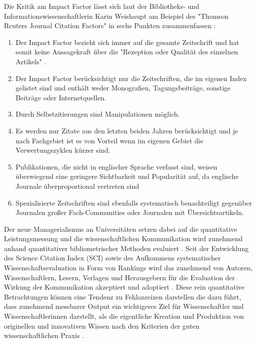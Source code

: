 Die Kritik am Impact Factor lässt sich laut der Bibliotheks- und Informationswissenschaftlerin Karin Weishaupt am Beispiel des "Thomson Reuters Journal Citation Factors" in sechs Punkten zusammenfassen \cite{Weishaupt_2009}:
\begin{enumerate}
\item Der Impact Factor bezieht sich immer auf die gesamte Zeitschrift und hat somit keine Aussagekraft über die "Rezeption oder Qualität des einzelnen Artikels" \cite{Weishaupt_2009}.
\item Der Impact Factor berücksichtigt nur die Zeitschriften, die im eigenen Index gelistet sind und enthält weder Monografien, Tagungsbeiträge, sonstige Beiträge oder Internetquellen.
\item Durch Selbstzitierungen sind Manipulationen möglich.
\item Es werden nur Zitate aus den letzten beiden Jahren berücksichtigt und je nach Fachgebiet ist es von Vorteil wenn im eigenen Gebiet die Verwertungszyklen kürzer sind.
\item Publikationen, die nicht in englischer Sprache verfasst sind, weisen überwiegend eine geringere Sichtbarkeit und Popularität auf, da englische Journale überproportional vertreten sind
\item Spezialisierte Zeitschriften sind ebenfalls systematisch benachteiligt gegenüber Journalen großer Fach-Communities oder Journalen mit Übersichtsartikeln.
\end{enumerate}

Der neue Managerialismus an Universitäten setzen dabei auf die quantitative Leistungsmessung und die wissenschaftlichen Kommunikation wird zunehmend anhand quantitativer bibliometrischer Methoden evaluiert \cite[:40]{Frost_2014}. Seit der Entwicklung des Science Citation Index (SCI) sowie des Aufkommens systematischer Wissenschaftsevaluation in Form von Rankings wird das zunehmend von Autoren, Wissenschaftlern, Lesern, Verlagen und Herausgebern für die Evaluation der Wirkung der Kommunikation akzeptiert und adoptiert \cite[:2]{Haustein_2012}. Diese rein quantitative Betrachtungen können eine Tendenz zu Fehlanreizen darstellen \cite{Wissenschaftsrat_2015} die dazu führt, dass zunehmend messbarer Output ein wichtigeres Ziel für Wissenschaftler und Wissenschaftlerinnen darstellt, als die eigentliche Kreation und Produktion von originellen und innovativen Wissen nach den Kriterien der guten wissenschaftlichen Praxis \cite[:41]{Frost_2014}.

